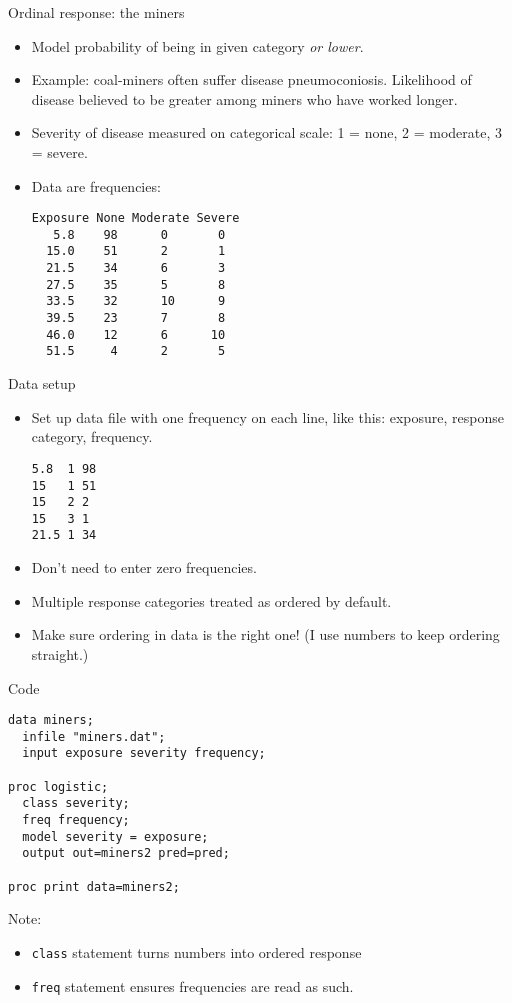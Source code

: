 \documentclass[pdf]{prosper}
\begin{document}
\begin{slide}{Ordinal response: the miners}


  \begin{itemize}
  \item 
Model probability of being in given category {\em or lower}.
\item Example: coal-miners often suffer disease pneumoconiosis. Likelihood of disease believed to be greater 
among miners who have worked longer. 
\item Severity of disease measured on categorical scale: 1 = none, 2
= moderate, 3 = severe.
\item Data are frequencies:
\begin{verbatim}
Exposure None Moderate Severe
   5.8    98      0       0
  15.0    51      2       1
  21.5    34      6       3
  27.5    35      5       8
  33.5    32      10      9
  39.5    23      7       8
  46.0    12      6      10
  51.5     4      2       5
  \end{verbatim}
  
  \end{itemize}
\end{slide}

\begin{slide}{Data setup}

  \begin{itemize}
  \item Set up data file with one frequency on each line, like this: exposure, response category, frequency.
\begin{verbatim}
5.8  1 98
15   1 51
15   2 2
15   3 1
21.5 1 34
\end{verbatim}
\item Don't need to enter zero frequencies.
\item Multiple response categories treated as ordered by default.
\item Make sure ordering in data is the right one! (I use numbers to keep ordering straight.)
  \end{itemize}
\end{slide}

\begin{slide}{Code}

\begin{verbatim}
data miners;
  infile "miners.dat";
  input exposure severity frequency;

proc logistic;
  class severity;
  freq frequency;
  model severity = exposure;
  output out=miners2 pred=pred;

proc print data=miners2;
\end{verbatim}

Note:
\begin{itemize}
\item \verb-class- statement  turns numbers into ordered response
\item \verb=freq= statement ensures frequencies are read as such.
\end{itemize}
  
\end{slide}
\end{document}
